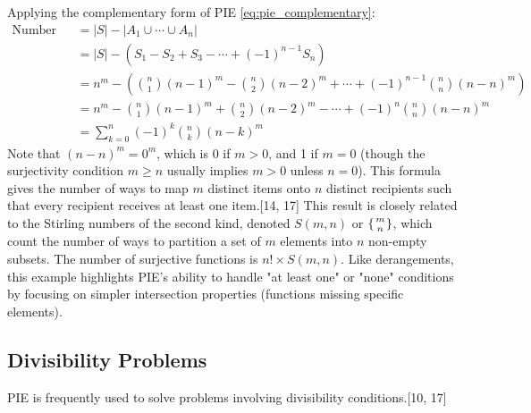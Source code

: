\documentclass[11pt]{amsart}
\theoremstyle{plain}
\theoremstyle{definition}
\theoremstyle{remark}
\begin{document}
Applying the complementary form of PIE \eqref{eq:pie_complementary}:
\begin{align*}
\text{Number of Surjective Functions} &= |S| - |A_1 \cup \cdots \cup A_n| \\
&= |S| - \left( S_1 - S_2 + S_3 - \cdots + (-1)^{n-1} S_n \right) \\
&= n^m - \left( \binom{n}{1}(n-1)^m - \binom{n}{2}(n-2)^m + \cdots + (-1)^{n-1} \binom{n}{n}(n-n)^m \right) \\
&= n^m - \binom{n}{1}(n-1)^m + \binom{n}{2}(n-2)^m - \cdots + (-1)^n \binom{n}{n}(n-n)^m \\
&= \sum_{k=0}^n (-1)^k \binom{n}{k} (n-k)^m
\label{eq:surjective}
\end{align*}
Note that $(n-n)^m = 0^m$, which is 0 if $m > 0$, and 1 if $m=0$ (though the surjectivity condition $m \ge n$ usually implies $m>0$ unless $n=0$). This formula gives the number of ways to map $m$ distinct items onto $n$ distinct recipients such that every recipient receives at least one item.[14, 17] This result is closely related to the Stirling numbers of the second kind, denoted $S(m, n)$ or $\{{m \atop n}\}$, which count the number of ways to partition a set of $m$ elements into $n$ non-empty subsets. The number of surjective functions is $n! \times S(m, n)$. Like derangements, this example highlights PIE's ability to handle "at least one" or "none" conditions by focusing on simpler intersection properties (functions missing specific elements).

\subsection{Divisibility Problems}
PIE is frequently used to solve problems involving divisibility conditions.[10, 17]
\end{document}
